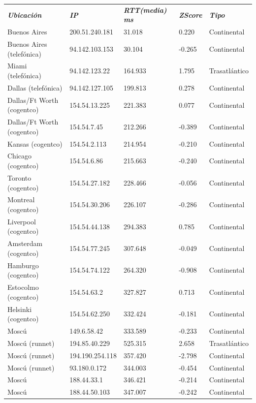 \begin{tabular}{lllll}

	\textit{\textbf{Ubicaci\'on}}	&	\textit{\textbf{IP}}	&	\textit{\textbf{RTT(media) ms}}	&	\textit{\textbf{ZScore}}	&	\textit{\textbf{Tipo}}	\\
	Buenos Aires			&	200.51.240.181	&	31.018	&	0.220	&	Continental	\\
	Buenos Aires (telef\'onica)	&	94.142.103.153	&	30.104	&	-0.265	&	Continental	\\
	Miami (telef\'onica)		&	94.142.123.22	&	164.933	&	1.795	&	Trasatl\'antico	\\
	Dallas (telef\'onica)		&	94.142.127.105	&	199.813	&	0.278	&	Continental	\\
	Dallas/Ft Worth (cogentco)	&	154.54.13.225	&	221.383	&	0.077	&	Continental	\\
	Dallas/Ft Worth (cogentco)	&	154.54.7.45	&	212.266	&	-0.389	&	Continental	\\
	Kansas (cogentco)		&	154.54.2.113	&	214.954	&	-0.210	&	Continental	\\
	Chicago (cogentco)		&	154.54.6.86	&	215.663	&	-0.240	&	Continental	\\
	Toronto (cogentco)		&	154.54.27.182	&	228.466	&	-0.056	&	Continental	\\
	Montreal (cogentco)		&	154.54.30.206	&	226.107	&	-0.286	&	Continental	\\
	Liverpool (cogentco)		&	154.54.44.138	&	294.383	&	0.785	&	Continental	\\
	Amsterdam (cogentco)		&	154.54.77.245	&	307.648	&	-0.049	&	Continental	\\
	Hamburgo (cogentco)		&	154.54.74.122	&	264.320	&	-0.908	&	Continental	\\
	Estocolmo (cogentco)		&	154.54.63.2	&	327.827	&	0.713	&	Continental	\\
	Helsinki (cogentco)		&	154.54.62.250	&	332.424	&	-0.181	&	Continental	\\
	Mosc\'u				&	149.6.58.42	&	333.589	&	-0.233	&	Continental	\\
	Mosc\'u (runnet)		&	194.85.40.229	&	525.315	&	2.658	&	Trasatl\'antico	\\
	Mosc\'u (runnet)		&	194.190.254.118	&	357.420	&	-2.798	&	Continental	\\
	Mosc\'u (runnet)		&	93.180.0.172	&	344.003	&	-0.454	&	Continental	\\
	Mosc\'u				&	188.44.33.1	&	346.421	&	-0.214	&	Continental	\\
	Mosc\'u				&	188.44.50.103	&	347.007	&	-0.242	&	Continental	\\

\end{tabular}

